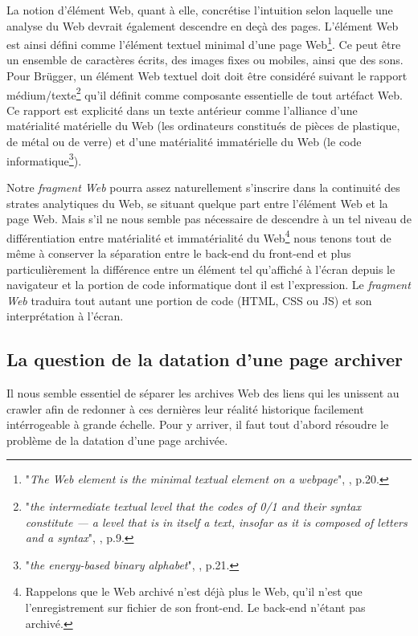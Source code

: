 \documentclass{tufte-book}
\begin{document}
La notion d'élément Web, quant à elle, concrétise l'intuition selon laquelle une analyse du Web devrait également descendre en deçà des pages. L'élément Web est ainsi défini comme l'élément textuel minimal d'une page Web\footnote{"\textit{The Web element is the minimal textual element on a webpage}", \citep{brugger_website_2009}, p.20.}. Ce peut être un ensemble de caractères écrits, des images fixes ou mobiles, ainsi que des sons. Pour Brügger, un élément Web textuel doit doit être considéré suivant le rapport médium/texte\footnote{"\textit{the intermediate textual level that the codes of 0/1 and their syntax constitute — a level that is in itself a text, insofar as it is composed of letters and a syntax}", \citep{brugger_website_2009}, p.9.} qu'il définit comme composante essentielle de tout artéfact Web. Ce rapport est explicité dans un texte antérieur \citep{brugger_does_2002} comme l'alliance d'une matérialité matérielle du Web (les ordinateurs constitués de pièces de plastique, de métal ou de verre) et d'une matérialité immatérielle du Web (le code informatique\footnote{"\textit{the energy-based binary alphabet}", \citep{brugger_does_2002}, p.21.}).

Notre \textit{fragment Web} pourra assez naturellement s'inscrire dans la continuité des strates analytiques du Web, se situant quelque part entre l'élément Web et la page Web. Mais s'il ne nous semble pas nécessaire de descendre à un tel niveau de différentiation entre matérialité et immatérialité du Web\footnote{Rappelons que le Web archivé n'est déjà plus le Web, qu'il n'est que l'enregistrement sur fichier de son front-end. Le back-end n'étant pas archivé.} nous tenons tout de même à conserver la séparation entre le back-end du front-end et plus particulièrement la différence entre un élément  tel qu'affiché à l'écran depuis le navigateur et la portion de code informatique dont il est l'expression. Le \textit{fragment Web} traduira tout autant une portion de code (HTML, CSS ou JS) et son interprétation à l'écran.

\subsection{La question de la datation d'une page archiver}

Il nous semble essentiel de séparer les archives Web des liens qui les unissent au crawler afin de redonner à ces dernières leur réalité historique facilement intérrogeable à grande échelle. Pour y arriver, il faut tout d'abord résoudre le problème de la datation d'une page archivée. 
\end{document}
